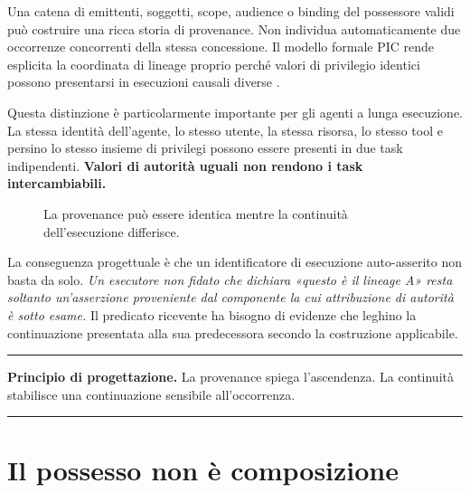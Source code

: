 \documentclass[10pt,oneside,openany]{book}
\newcommand{\principle}[1]{%
  \vspace{4pt}
  \noindent\begin{minipage}{\linewidth}
  \hrule\vspace{5pt}
  \small\sffamily\raggedright\textbf{Principio di progettazione.} #1
  \vspace{5pt}\hrule
  \end{minipage}\vspace{4pt}
}
\begin{document}
Una catena di emittenti, soggetti, scope, audience o binding del possessore validi può costruire una ricca storia di provenance. Non individua automaticamente due occorrenze concorrenti della stessa concessione. Il modello formale PIC rende esplicita la coordinata di lineage proprio perché valori di privilegio identici possono presentarsi in esecuzioni causali diverse \cite{gallo2026pic}.

Questa distinzione è particolarmente importante per gli agenti a lunga esecuzione. La stessa identità dell'agente, lo stesso utente, la stessa risorsa, lo stesso tool e persino lo stesso insieme di privilegi possono essere presenti in due task indipendenti. \textbf{Valori di autorità uguali non rendono i task intercambiabili.}

\begin{figure}[ht]
\centering
{}
\caption{La provenance può essere identica mentre la continuità dell'esecuzione differisce.}
\end{figure}

La conseguenza progettuale è che un identificatore di esecuzione auto-asserito non basta da solo. \emph{Un esecutore non fidato che dichiara «questo è il lineage A» resta soltanto un'asserzione proveniente dal componente la cui attribuzione di autorità è sotto esame.} Il predicato ricevente ha bisogno di evidenze che leghino la continuazione presentata alla sua predecessora secondo la costruzione applicabile.

\principle{La provenance spiega l'ascendenza. La continuità stabilisce una continuazione sensibile all'occorrenza.}

\chapter{Il possesso non è composizione}
\end{document}
